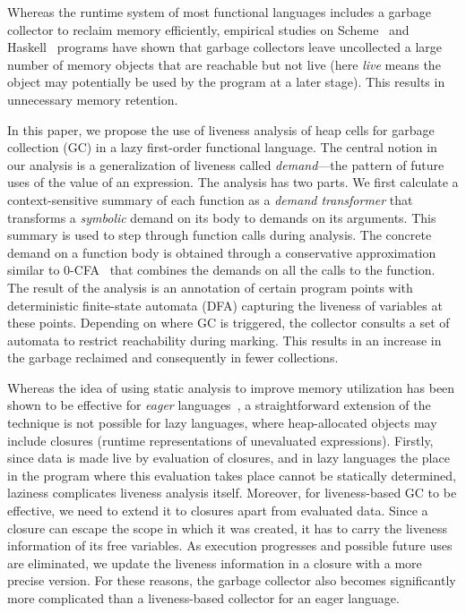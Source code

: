 \documentclass[9pt,nonatbib]{sigplanconf}
\begin{document}
Whereas  the runtime  system  of most  functional  languages includes  a
garbage collector to reclaim memory efficiently, empirical studies on
Scheme~\cite{karkare06effectiveness}  and  Haskell~\cite{rojemo96lag}
programs have shown that garbage  collectors leave uncollected a large
number of  memory objects that are  reachable but not live  (here {\em
  live} means the  object may potentially be used by  the program at a
later stage).  This results in unnecessary memory retention.

In this paper,  we propose the use of liveness  analysis of heap cells
for garbage collection (GC) in a lazy first-order functional language.
The central  notion in  our analysis is  a generalization  of liveness
called {\em  demand}---the pattern of future  uses of the value  of an
expression.   The  analysis  has  two parts.   We  first  calculate  a
context-sensitive  summary   of  each   function  as  a   {\em  demand
  transformer} that transforms a {\em  symbolic} demand on its body to
demands  on its  arguments.   This  summary is  used  to step  through
function calls  during analysis.   The concrete  demand on  a function
body  is  obtained through  a  conservative  approximation similar  to
0-CFA~\cite{Shivers:1988} that  combines the demands on  all the calls
to  the function.   The result  of the  analysis is  an annotation  of
certain program points with  deterministic finite-state automata (DFA)
capturing the  liveness of  variables at  these points.   Depending on
where GC  is triggered, the  collector consults  a set of  automata to
restrict reachability during marking.  This  results in an increase in
the garbage reclaimed and consequently in fewer collections.


Whereas  the idea  of  using static  analysis  to improve  memory
  utilization  has  been  shown  to   be  effective  for  {\em  eager}
  languages~\cite{asati14lgc,       HofmannJ03,       inoue88analysis,
    lee05static}, a straightforward extension  of the technique is not
  possible  for  lazy  languages,  where  heap-allocated  objects  may
  include   closures    (runtime   representations    of   unevaluated
  expressions).
Firstly, since  data is made  live by  evaluation of closures,  and in
lazy languages  the place in  the program where this  evaluation takes
place cannot  be statically determined, laziness  complicates liveness
analysis itself.  Moreover, for liveness-based  GC to be effective, we
need to  extend it  to closures  apart from  evaluated data.   Since a
closure can escape the scope in which  it was created, it has to carry
the  liveness  information  of   its  free  variables.   As  execution
progresses  and possible  future uses  are eliminated,  we update  the
liveness  information  in  a  closure with  a  more  precise  version.
For these  reasons,  the  garbage   collector  also  becomes
significantly more  complicated than a liveness-based  collector for an
eager language. 
\end{document}
